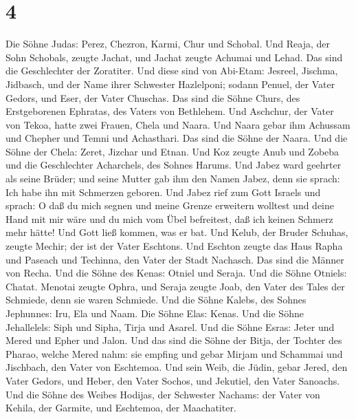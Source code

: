 \hypertarget{section-3}{%
\section{4}\label{section-3}}

 Die Söhne Judas: Perez, Chezron, Karmi, Chur und Schobal.
 Und Reaja, der Sohn Schobals, zeugte Jachat, und Jachat
zeugte Achumai und Lehad. Das sind die Geschlechter der Zoratiter.
 Und diese sind von Abi-Etam: Jesreel, Jischma, Jidbasch,
und der Name ihrer Schwester Hazlelponi;  sodann Penuel,
der Vater Gedors, und Eser, der Vater Chuschas. Das sind die Söhne
Churs, des Erstgeborenen Ephratas, des Vaters von Bethlehem.
 Und Aschchur, der Vater von Tekoa, hatte zwei Frauen,
Chela und Naara.  Und Naara gebar ihm Achussam und Chepher
und Temni und Achasthari. Das sind die Söhne der Naara. 
Und die Söhne der Chela: Zeret, Jizchar und Etnan.  Und
Koz zeugte Anub und Zobeba und die Geschlechter Acharchels, des Sohnes
Harums.  Und Jabez ward geehrter als seine Brüder; und
seine Mutter gab ihm den Namen Jabez, denn sie sprach: Ich habe ihn mit
Schmerzen geboren.  Und Jabez rief zum Gott Israels und
sprach: O daß du mich segnen und meine Grenze erweitern wolltest und
deine Hand mit mir wäre und du mich vom Übel befreitest, daß ich keinen
Schmerz mehr hätte! Und Gott ließ kommen, was er bat. 
Und Kelub, der Bruder Schuhas, zeugte Mechir; der ist der Vater
Eschtons.  Und Eschton zeugte das Haus Rapha und Paseach
und Techinna, den Vater der Stadt Nachasch. Das sind die Männer von
Recha.  Und die Söhne des Kenas: Otniel und Seraja. Und
die Söhne Otniels: Chatat.  Menotai zeugte Ophra, und
Seraja zeugte Joab, den Vater des Tales der Schmiede, denn sie waren
Schmiede.  Und die Söhne Kalebs, des Sohnes Jephunnes:
Iru, Ela und Naam. Die Söhne Elas: Kenas.  Und die Söhne
Jehallelels: Siph und Sipha, Tirja und Asarel.  Und die
Söhne Esras: Jeter und Mered und Epher und Jalon. Und das sind die Söhne
der Bitja, der Tochter des Pharao, welche Mered nahm: sie empfing und
gebar Mirjam und Schammai und Jischbach, den Vater von Eschtemoa.
 Und sein Weib, die Jüdin, gebar Jered, den Vater Gedors,
und Heber, den Vater Sochos, und Jekutiel, den Vater Sanoachs.
 Und die Söhne des Weibes Hodijas, der Schwester Nachams:
der Vater von Kehila, der Garmite, und Eschtemoa, der Maachatiter.

